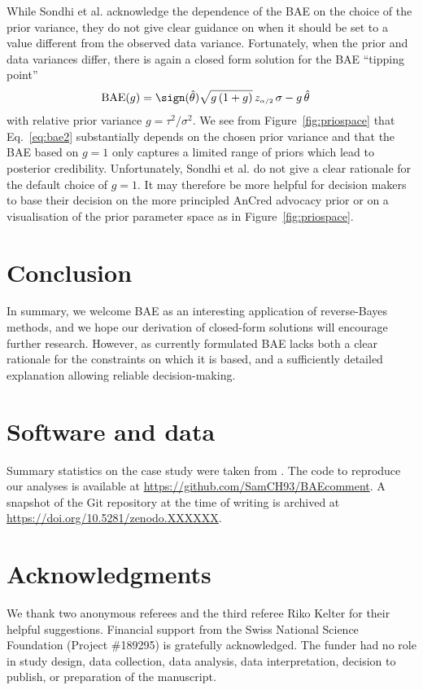 While Sondhi et al. acknowledge the dependence of the BAE on the choice of the
prior variance, they do not give clear guidance on when it should be set to a
value different from the observed data variance. Fortunately, when the prior and
data variances differ, there is again a closed form solution for the BAE
``tipping point''
\begin{align}
  \text{BAE}(g)
  & =  \sign(\hat{\theta}) \sqrt{g \, (1 + g)} \, z_{\scriptscriptstyle \alpha/2} \, \sigma
    - g \, \hat{\theta}
    \label{eq:bae2}
\end{align}
with relative prior variance $g = \tau^{2}/\sigma^{2}$. We see from
Figure~\ref{fig:priospace} that Eq.~\eqref{eq:bae2} substantially depends on the
chosen prior variance and that the BAE based on $g = 1$ only captures a limited
range of priors which lead to posterior credibility. Unfortunately, Sondhi et
al. do not give a clear rationale for the default choice of $g = 1$. It may
therefore be more helpful for decision makers to base their decision on the more
principled AnCred advocacy prior or on a visualisation of the prior parameter
space as in Figure~\ref{fig:priospace}.

\section{Conclusion}
In summary, we welcome BAE as an interesting application of reverse-Bayes
methods, and we hope our derivation of closed-form solutions will encourage
further research. However, as currently formulated BAE lacks both a clear
rationale for the constraints on which it is based, and a sufficiently detailed
explanation allowing reliable decision-making.

\section*{Software and data}
Summary statistics on the case study were taken from \citet{Sondhi2021}. The
code to reproduce our analyses is available at
\url{https://github.com/SamCH93/BAEcomment}. A snapshot of the Git repository at
the time of writing is archived at \url{https://doi.org/10.5281/zenodo.XXXXXX}.

\section*{Acknowledgments}
We thank two anonymous referees and the third referee Riko Kelter for their
helpful suggestions. Financial support from the Swiss National Science
Foundation (Project \#189295) is gratefully acknowledged. The funder had no role
in study design, data collection, data analysis, data interpretation, decision
to publish, or preparation of the manuscript.



